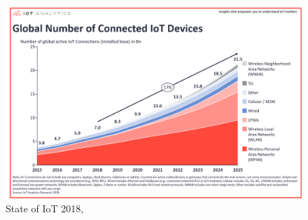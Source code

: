 \documentclass[11pt]{article}
\begin{document}
\begin{figure}[H]
	\begin{center}
		\includegraphics[scale=0.275]{stateofIoT2018.png}
		\caption{State of IoT 2018, \cite{3}}
		\label{img_state}
	\end{center}
\end{figure}
\end{document}
